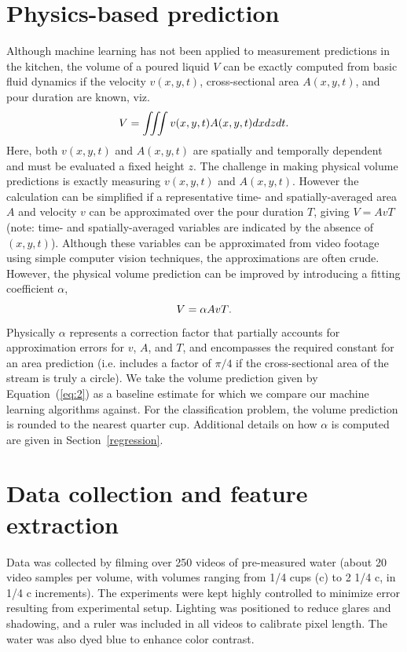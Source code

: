 \documentclass[twocolumn,10pt]{article}
\begin{document}
\section{Physics-based prediction}
Although machine learning has not been applied to measurement predictions in the kitchen, the volume of a poured liquid $V$ can be exactly computed from basic fluid dynamics if the velocity $v(x,y,t)$, cross-sectional area $A(x,y,t)$, and pour duration are known, viz. 
\begin{equation} \label{eq:1}
V = \iiint v(x,y,t) A(x,y,t) dx dz dt \\.
\end{equation}
Here, both $v(x,y,t)$ and $A(x,y,t)$ are spatially and temporally dependent and must be evaluated a fixed height $z$. The challenge in making physical volume predictions is exactly measuring $v(x,y,t)$ and $A(x,y,t)$. However the calculation can be simplified if a representative time- and spatially-averaged area $A$ and velocity $v$ can be approximated over the pour duration $T$, giving $V = AvT$ (note: time- and spatially-averaged variables are indicated by the absence of $(x,y,t)$). Although these variables can be approximated from video footage using simple computer vision techniques, the approximations are often crude. However, the physical volume prediction can be improved by introducing a fitting coefficient $\alpha$, 
\begin{equation} \label{eq:2}
V = \alpha AvT \\.
\end{equation}
Physically $\alpha$ represents a correction factor that partially accounts for approximation errors for $v$, $A$, and $T$, and encompasses the required constant for an area prediction (i.e. includes a factor of $\pi/4$ if the cross-sectional area of the stream is truly a circle). We take the volume prediction given by Equation~(\ref{eq:2}) as a baseline estimate for which we compare our machine learning algorithms against. For the classification problem, the volume prediction is rounded to the nearest quarter cup. Additional details on how $\alpha$ is computed are given in Section~\ref{regression}.  

\section{Data collection and feature extraction}
\label{Data collection}
Data was collected by filming over 250 videos of pre-measured water (about 20 video samples per volume, with volumes ranging from 1/4 cups (c) to 2 1/4 c, in 1/4 c increments). The experiments were kept highly controlled to minimize error resulting from experimental setup. Lighting was positioned to reduce glares and shadowing, and a ruler was included in all videos to calibrate pixel length. The water was also dyed blue to enhance color contrast. 
\end{document}

